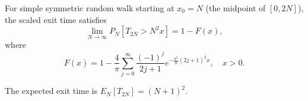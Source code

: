 For simple symmetric random walk starting at $x_0 = N$ (the midpoint of $[0,2N]$), the scaled exit time satisfies
$$\lim_{N \to \infty} P_N\left[ T_{2N} > N^2 x \right] = 1 - F(x),$$
where
$$F(x) = 1 - \frac{4}{\pi} \sum_{j=0}^{\infty} \frac{(-1)^j}{2j+1} e^{-\frac{\pi^2}{8}(2j+1)^2 x}, \quad x > 0.$$

The expected exit time is $E_N[T_{2N}] = (N+1)^2$.
